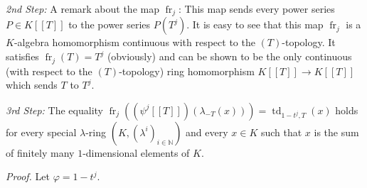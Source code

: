 \documentclass[numbers=enddot,12pt,final,onecolumn,notitlepage]{scrartcl}%
\begin{document}
\textit{2nd Step:} A remark about the map $\operatorname*{fr}\nolimits_{j}$:
This map sends every power series $P\in K\left[  \left[  T\right]  \right]  $
to the power series $P\left(  T^{j}\right)  $. It is easy to see that this map
$\operatorname*{fr}\nolimits_{j}$ is a $K$-algebra homomorphism continuous
with respect to the $\left(  T\right)  $-topology. It satisfies
$\operatorname*{fr}\nolimits_{j}\left(  T\right)  =T^{j}$ (obviously) and can
be shown to be the only continuous (with respect to the $\left(  T\right)
$-topology) ring homomorphism $K\left[  \left[  T\right]  \right]  \rightarrow
K\left[  \left[  T\right]  \right]  $ which sends $T$ to $T^{j}$.

\textit{3rd Step:} The equality $\operatorname*{fr}\nolimits_{j}\left(
\left(  \psi^{j}\left[  \left[  T\right]  \right]  \right)  \left(
\lambda_{-T}\left(  x\right)  \right)  \right)  =\operatorname*{td}%
\nolimits_{1-t^{j},T}\left(  x\right)  $ holds for every special $\lambda
$-ring $\left(  K,\left(  \lambda^{i}\right)  _{i\in\mathbb{N}}\right)  $ and
every $x\in K$ such that $x$ is the sum of finitely many $1$-dimensional
elements of $K$.

\textit{Proof.} Let $\varphi=1-t^{j}$.
\end{document}
